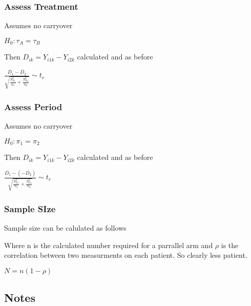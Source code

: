\documentclass[
  letterpaper,
  DIV=11,
  numbers=noendperiod]{scrreprt}
\begin{document}
\hypertarget{assess-treatment}{%
\subsubsection{Assess Treatment}\label{assess-treatment}}

Assumes no carryover

\(H_0 : \tau_A = \tau_B\)

Then \(D_{ik} = Y_{i1k} - Y_{i2k}\) calculated and as before

\(\frac{\bar{D_1} - \bar{D_2}} {\sqrt{  \frac{S^2_{D_1}}{n_1} +  \frac{S^2_{D_2}}{n_2} }} \sim t_r\)

\hypertarget{assess-period}{%
\subsubsection{Assess Period}\label{assess-period}}

Assumes no carryover

\(H_0 : \pi_1 = \pi_2\)

Then \(D_{ik} = Y_{i1k} - Y_{i2k}\) calculated and as before

\(\frac{\bar{D_1} - (-\bar{D_2})} {\sqrt{  \frac{S^2_{D_1}}{n_1} +  \frac{S^2_{D_2}}{n_2} }} \sim t_r\)

\hypertarget{sample-size}{%
\subsubsection{Sample SIze}\label{sample-size}}

Sample size can be calulated as follows

Where n is the calculated number required for a parrallel arm and
\(\rho\) is the correlation between two measurments on each patient. So
clearly less patient.

\(N = n(1-\rho)\)

\hypertarget{notes}{%
\subsection{Notes}\label{notes}}
\end{document}
